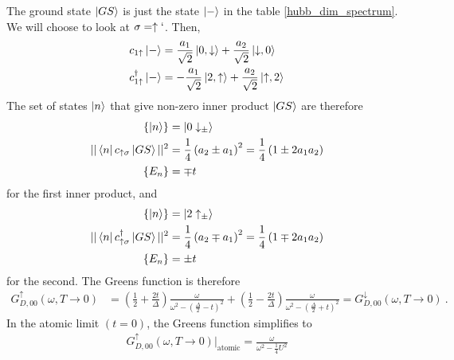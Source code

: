 \documentclass[12pt]{article}
\numberwithin{equation}{section}
\begin{document}
The ground state $\ket{GS}$ is just the state $\ket{-}$ in the table \ref{hubb_dim_spectrum}. We will choose to look at $\sigma = \uparrow`$. Then,
\begin{equation}\begin{aligned}
	c_{1\uparrow}\ket{-} &= \frac{a_1}{\sqrt 2}\ket{0, \downarrow} + \frac{a_2}{\sqrt 2}\ket{\downarrow,0}\\
	c^\dagger_{1\uparrow}\ket{-} &= -\frac{a_1}{\sqrt 2}\ket{2, \uparrow} + \frac{a_2}{\sqrt 2}\ket{\uparrow,2}\\
\end{aligned}\end{equation}
The set of states $\ket{n}$ that give non-zero inner product $\ket{GS}$ are therefore
\begin{equation}\begin{aligned}
	\left\{ \ket{n} \right\} &= \ket{0\downarrow_\pm}\\
	||\bra{n}c_{\uparrow\sigma}\ket{GS}||^2 &= \frac{1}{4}\left(a_2 \pm a_1 \right)^2 = \frac{1}{4}\left(1 \pm 2a_1a_2\right)\\
	\left\{ E_n \right\} &= \mp t
\end{aligned}\end{equation}
for the first inner product, and
\begin{equation}\begin{aligned}
	\left\{\ket{n}\right\} &= \ket{2\uparrow_\pm}\\
	||\bra{n}c^\dagger_{\uparrow\sigma}\ket{GS}||^2 &= \frac{1}{4}\left( a_2 \mp a_1 \right)^2 = \frac{1}{4}\left(1 \mp 2a_1a_2\right)\\
	\left\{ E_n \right\} &= \pm t
\end{aligned}\end{equation}
for the second. The Greens function is therefore
\begin{equation}\begin{aligned}
	\label{dimer_local_G}
	G_{D,00}^\uparrow(\omega, T \to 0) &= \left( \frac{1}{2} + \frac{2t}{\Delta} \right) \frac{\omega}{\omega^2 - \left(\frac{\Delta}{2} - t\right) ^2} + \left( \frac{1}{2} - \frac{2t}{\Delta} \right) \frac{\omega}{\omega^2 - \left(\frac{\Delta}{2} + t\right) ^2} = G_{D,00}^\downarrow(\omega, T \to 0)~.
\end{aligned}\end{equation}
In the atomic limit $(t=0)$, the Greens function simplifies to
\begin{equation}\begin{aligned}
	G_{D,00}^\uparrow(\omega, T \to 0) \bigg\vert_\text{atomic} = \frac{\omega}{\omega^2 - \frac{1}{4}U^2}
\end{aligned}\end{equation}
\end{document}

